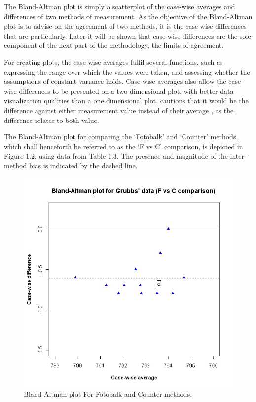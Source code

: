 \documentclass[12pt, a4paper]{report}
\begin{document}
	The Bland-Altman plot is simply a scatterplot of the case-wise
	averages and differences of two methods of measurement. As the
	objective of the Bland-Altman plot is to advise on the agreement
	of two methods, it is the case-wise differences that are
	particularly. Later it will be shown that case-wise differences
	are the sole component of the next part of the methodology, the
	limits of agreement.
	
	For creating plots, the case wise-averages fulfil several
	functions, such as expressing the range over which the values were
	taken, and assessing whether the assumptions of constant variance
	holds. Case-wise averages also allow the case-wise differences to
	be presented on a two-dimensional plot, with better data
	visualization qualities than a one dimensional plot. \citet{BA86}
	cautions that it would be the difference against either
	measurement value instead of their average , as the difference
	relates to both value.
	
	The Bland-Altman plot for comparing the `Fotobalk' and `Counter'
	methods, which shall henceforth be referred to as the `F vs C'
	comparison,  is depicted in Figure 1.2, using data from Table 1.3.
	The presence and magnitude of the inter-method bias is indicated
	by the dashed line.
	
	\begin{figure}[h!]
		\begin{center}
			\includegraphics[width=120mm]{images/GrubbsBAplot-noLOA.jpeg}
			\caption{Bland-Altman plot For Fotobalk and Counter methods.}\label{GrubbsBA-noLOA}
		\end{center}
	\end{figure}
	
\end{document}
